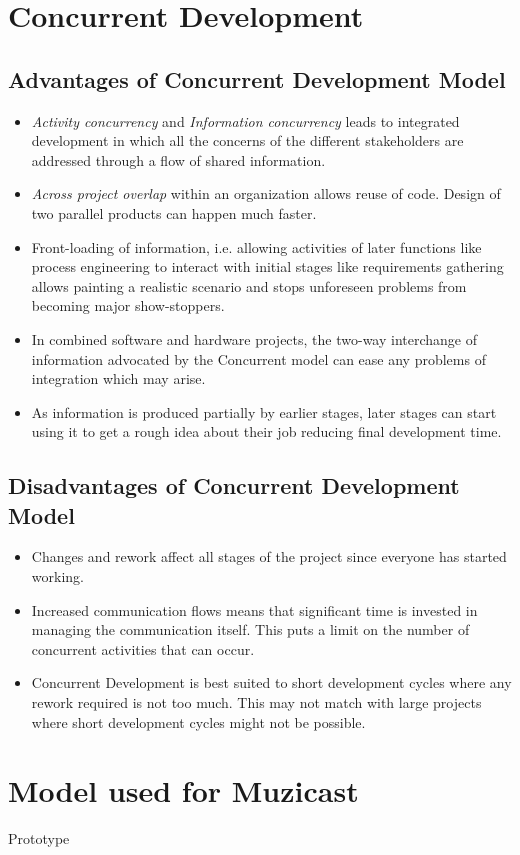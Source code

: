 \documentclass{article}
\begin{document}
\newpage{}
\section{Concurrent Development}
\subsection{Advantages of Concurrent Development Model}
\begin{itemize}
\item \emph{Activity concurrency} and \emph{Information concurrency} leads to integrated development in which all the concerns
of the different stakeholders are addressed through a flow of shared information.
\item \emph{Across project overlap} within an organization allows reuse of code. Design of two parallel products can happen much
faster.
\item Front-loading of information, i.e. allowing activities of later functions like process engineering to interact with initial
stages like requirements gathering allows painting a realistic scenario and stops unforeseen problems from becoming major show-stoppers.
\item In combined software and hardware projects, the two-way interchange of information advocated by the Concurrent model can
ease any problems of integration which may arise.
\item As information is produced partially by earlier stages, later stages can start using it to get a rough idea about their job reducing final development time.
\end{itemize}

\subsection{Disadvantages of Concurrent Development Model}
\begin{itemize}
\item Changes and rework affect all stages of the project since everyone has started working.
\item Increased communication flows means that significant time is invested in managing the communication itself. This puts a limit
on the number of concurrent activities that can occur.
\item Concurrent Development is best suited to short development cycles where any rework required is not too much. This may not match
with large projects where short development cycles might not be possible.
\end{itemize}

\newpage{}
\section{Model used for Muzicast}

Prototype
\end{document}
